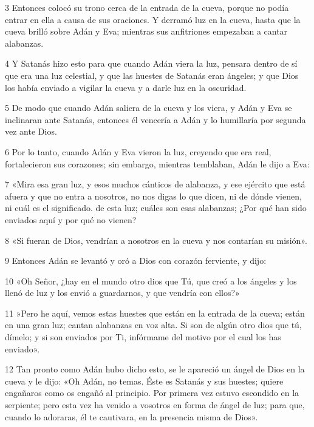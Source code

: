 \par 3 Entonces colocó su trono cerca de la entrada de la cueva, porque no podía entrar en ella a causa de sus oraciones. Y derramó luz en la cueva, hasta que la cueva brilló sobre Adán y Eva; mientras sus anfitriones empezaban a cantar alabanzas.

\par 4 Y Satanás hizo esto para que cuando Adán viera la luz, pensara dentro de sí que era una luz celestial, y que las huestes de Satanás eran ángeles; y que Dios los había enviado a vigilar la cueva y a darle luz en la oscuridad.

\par 5 De modo que cuando Adán saliera de la cueva y los viera, y Adán y Eva se inclinaran ante Satanás, entonces él vencería a Adán y lo humillaría por segunda vez ante Dios.

\par 6 Por lo tanto, cuando Adán y Eva vieron la luz, creyendo que era real, fortalecieron sus corazones; sin embargo, mientras temblaban, Adán le dijo a Eva:

\par 7 «Mira esa gran luz, y esos muchos cánticos de alabanza, y ese ejército que está afuera y que no entra a nosotros, no nos digas lo que dicen, ni de dónde vienen, ni cuál es el significado. de esta luz; cuáles son esas alabanzas; ¿Por qué han sido enviados aquí y por qué no vienen?

\par 8 «Si fueran de Dios, vendrían a nosotros en la cueva y nos contarían su misión».

\par 9 Entonces Adán se levantó y oró a Dios con corazón ferviente, y dijo:

\par 10 «Oh Señor, ¿hay en el mundo otro dios que Tú, que creó a los ángeles y los llenó de luz y los envió a guardarnos, y que vendría con ellos?»

\par 11 »Pero he aquí, vemos estas huestes que están en la entrada de la cueva; están en una gran luz; cantan alabanzas en voz alta. Si son de algún otro dios que tú, dímelo; y si son enviados por Ti, infórmame del motivo por el cual los has enviado».

\par 12 Tan pronto como Adán hubo dicho esto, se le apareció un ángel de Dios en la cueva y le dijo: «Oh Adán, no temas. Éste es Satanás y sus huestes; quiere engañaros como os engañó al principio. Por primera vez estuvo escondido en la serpiente; pero esta vez ha venido a vosotros en forma de ángel de luz; para que, cuando lo adoraras, él te cautivara, en la presencia misma de Dios».

